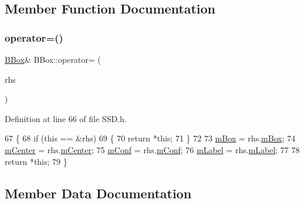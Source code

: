 \subsection{Member Function Documentation}
\mbox{\label{class_b_box_ac902995103b05e2e5a2e6d58883a85e5}} 
\subsubsection{\texorpdfstring{operator=()}{operator=()}}
{\footnotesize\ttfamily \mbox{\hyperlink{class_b_box}{B\+Box}}\& B\+Box\+::operator= (\begin{DoxyParamCaption}\item[{const \mbox{\hyperlink{class_b_box}{B\+Box}} \&}]{rhs }\end{DoxyParamCaption})\hspace{0.3cm}{\ttfamily [inline]}}



Definition at line 66 of file S\+S\+D.\+h.


\begin{DoxyCode}
67     \{
68         \textcolor{keywordflow}{if} (\textcolor{keyword}{this} == &rhs)
69         \{
70             \textcolor{keywordflow}{return} *\textcolor{keyword}{this};
71         \}
72 
73         \mbox{\hyperlink{class_b_box_ac9143a10a051ff8ce0ae26e6c1e4b4e1}{mBox}} = rhs.\mbox{\hyperlink{class_b_box_ac9143a10a051ff8ce0ae26e6c1e4b4e1}{mBox}};
74         \mbox{\hyperlink{class_b_box_a4367a9314599320633ef19abfae3a83c}{mCenter}} = rhs.\mbox{\hyperlink{class_b_box_a4367a9314599320633ef19abfae3a83c}{mCenter}};
75         \mbox{\hyperlink{class_b_box_ac2b9483e6f0372284e06724d7ae953ff}{mConf}} = rhs.\mbox{\hyperlink{class_b_box_ac2b9483e6f0372284e06724d7ae953ff}{mConf}};
76         \mbox{\hyperlink{class_b_box_a779985e94cd7b9b3c62208493de419be}{mLabel}} = rhs.\mbox{\hyperlink{class_b_box_a779985e94cd7b9b3c62208493de419be}{mLabel}};
77 
78         \textcolor{keywordflow}{return} *\textcolor{keyword}{this};
79     \}
\end{DoxyCode}


\subsection{Member Data Documentation}
\mbox{\label{class_b_box_ac9143a10a051ff8ce0ae26e6c1e4b4e1}} 
